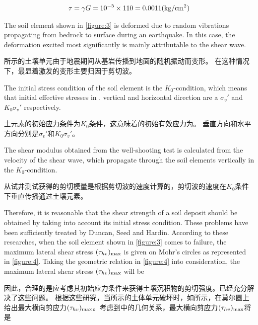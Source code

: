 \begin{align}
    \tau=\gamma{}G=10^{-5}\times{}110=0.0011(\rm{kg/cm^2})
    \label{equation:5}
\end{align}


\begin{paracol}{2}
    
    The soil element shown in \autoref{figure:3} is deformed due to random vibrations propagating from bedrock to surface during an earthquake. In this case, the deformation excited most significantly is mainly attributable to the shear wave.

    \switchcolumn

    所示的土壤单元由于地震期间从基岩传播到地面的随机振动而变形。 在这种情况下，最显着激发的变形主要归因于剪切波。      \switchcolumn*

    The initial stress condition of the soil element is the $K_0$-condition, which means that initial effective stresses in . vertical and horizontal direction are a $\sigma_v'$ and $K_0\sigma_v'$ respectively.

    \switchcolumn
       
    土元素的初始应力条件为$K_0$条件，这意味着的初始有效应力为。 垂直方向和水平方向分别是$\sigma_v'$和$K_0\sigma_v'$。
    
    \switchcolumn*

    The shear modulus obtained from the well-shooting test is calculated from the velocity of the shear wave, which propagate through the soil elements vertically in the $K_0$-condition.

    \switchcolumn
       
    从试井测试获得的剪切模量是根据剪切波的速度计算的，剪切波的速度在$K_0$条件下垂直传播通过土壤元素。

\end{paracol}



\begin{paracol}{2}
    
    Therefore, it is reasonable that the shear strength of a soil deposit should be obtained by taking into account its initial stress condition. These problems have been sufficiently treated by Duncan, Seed and Hardin. According to these researches, when the soil element shown in \autoref{figure:3} comes to failure, the maximum lateral shear stress $(\tau_{hv})_{\rm{max}}$ is given on Mohr's circles as represented in \autoref{figure:4}. Taking the geometric relation in \autoref{figure:4} into consideration, the maximum lateral shear stress $(\tau_{hv})_{\rm{max}}$ will be

    \switchcolumn

    因此，合理的是应考虑其初始应力条件来获得土壤沉积物的剪切强度。\citet{Duncan1969101,Seed19711099,Hardin1973667}已经充分解决了这些问题。 根据这些研究，当所示的土体单元破坏时，如所示，在莫尔圆上给出最大横向剪应力$(\tau_{hv})_{\rm{max}}$。考虑到中的几何关系，最大横向剪应力$(\tau_{hv})_{\rm{max}}$将是

\end{paracol}

